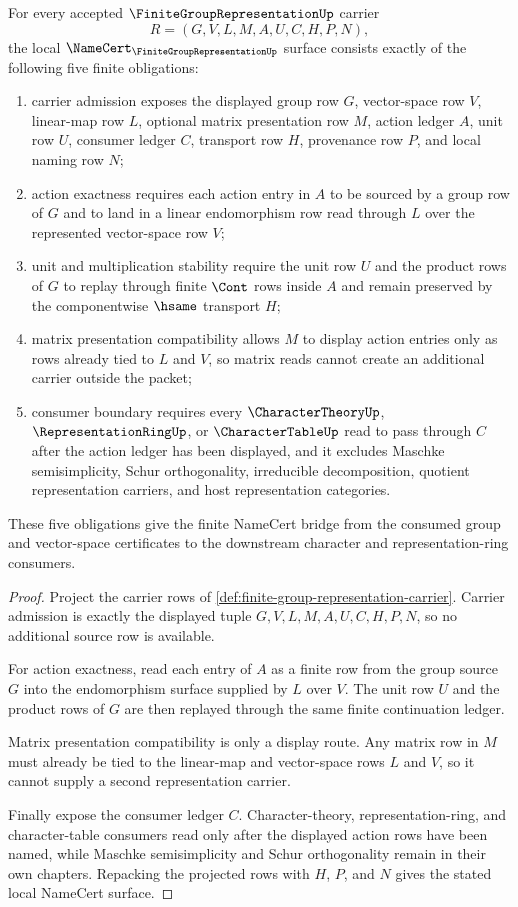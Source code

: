 \begin{theorem}
\label{thm:finite-group-representation-namecert-bridge}
For every accepted $\FiniteGroupRepresentationUp$ carrier
$$
R=(G,V,L,M,A,U,C,H,P,N),
$$
the local $\NameCert_{\FiniteGroupRepresentationUp}$ surface consists exactly of the following five finite obligations:
\begin{enumerate}
\item carrier admission exposes the displayed group row $G$, vector-space row $V$, linear-map row $L$, optional matrix presentation row $M$, action ledger $A$, unit row $U$, consumer ledger $C$, transport row $H$, provenance row $P$, and local naming row $N$;
\item action exactness requires each action entry in $A$ to be sourced by a group row of $G$ and to land in a linear endomorphism row read through $L$ over the represented vector-space row $V$;
\item unit and multiplication stability require the unit row $U$ and the product rows of $G$ to replay through finite $\Cont$ rows inside $A$ and remain preserved by the componentwise $\hsame$ transport $H$;
\item matrix presentation compatibility allows $M$ to display action entries only as rows already tied to $L$ and $V$, so matrix reads cannot create an additional carrier outside the packet;
\item consumer boundary requires every $\CharacterTheoryUp$, $\RepresentationRingUp$, or $\CharacterTableUp$ read to pass through $C$ after the action ledger has been displayed, and it excludes Maschke semisimplicity, Schur orthogonality, irreducible decomposition, quotient representation carriers, and host representation categories.
\end{enumerate}
These five obligations give the finite NameCert bridge from the consumed group and vector-space certificates to the downstream character and representation-ring consumers.
\end{theorem}
\begin{proof}
Project the carrier rows of \autoref{def:finite-group-representation-carrier}. Carrier admission is exactly the displayed tuple $G,V,L,M,A,U,C,H,P,N$, so no additional source row is available.

For action exactness, read each entry of $A$ as a finite row from the group source $G$ into the endomorphism surface supplied by $L$ over $V$. The unit row $U$ and the product rows of $G$ are then replayed through the same finite continuation ledger.

Matrix presentation compatibility is only a display route. Any matrix row in $M$ must already be tied to the linear-map and vector-space rows $L$ and $V$, so it cannot supply a second representation carrier.

Finally expose the consumer ledger $C$. Character-theory, representation-ring, and character-table consumers read only after the displayed action rows have been named, while Maschke semisimplicity and Schur orthogonality remain in their own chapters. Repacking the projected rows with $H$, $P$, and $N$ gives the stated local NameCert surface.
\end{proof}
